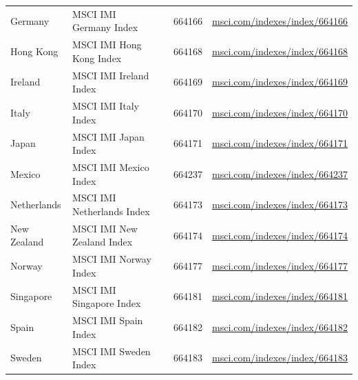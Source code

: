 {\begin{longtable}{l l l l l}
\hspace{1em}Germany & MSCI IMI Germany Index &  & 664166 & \href{https://www.msci.com/indexes/index/664166}{msci.com/indexes/index/664166} \\
\hspace{1em}Hong Kong & MSCI IMI Hong Kong Index &  & 664168 & \href{https://www.msci.com/indexes/index/664168}{msci.com/indexes/index/664168} \\
\hspace{1em}Ireland & MSCI IMI Ireland Index &  & 664169 & \href{https://www.msci.com/indexes/index/664169}{msci.com/indexes/index/664169} \\
\hspace{1em}Italy & MSCI IMI Italy Index &  & 664170 & \href{https://www.msci.com/indexes/index/664170}{msci.com/indexes/index/664170} \\
\hspace{1em}Japan & MSCI IMI Japan Index &  & 664171 & \href{https://www.msci.com/indexes/index/664171}{msci.com/indexes/index/664171} \\
\hspace{1em}Mexico & MSCI IMI Mexico Index &  & 664237 & \href{https://www.msci.com/indexes/index/664237}{msci.com/indexes/index/664237} \\
\hspace{1em}Netherlands & MSCI IMI Netherlands Index &  & 664173 & \href{https://www.msci.com/indexes/index/664173}{msci.com/indexes/index/664173} \\
\hspace{1em}New Zealand & MSCI IMI New Zealand Index &  & 664174 & \href{https://www.msci.com/indexes/index/664174}{msci.com/indexes/index/664174} \\
\hspace{1em}Norway & MSCI IMI Norway Index &  & 664177 & \href{https://www.msci.com/indexes/index/664177}{msci.com/indexes/index/664177} \\
\hspace{1em}Singapore & MSCI IMI Singapore Index &  & 664181 & \href{https://www.msci.com/indexes/index/664181}{msci.com/indexes/index/664181} \\
\hspace{1em}Spain & MSCI IMI Spain Index &  & 664182 & \href{https://www.msci.com/indexes/index/664182}{msci.com/indexes/index/664182} \\
\hspace{1em}Sweden & MSCI IMI Sweden Index &  & 664183 & \href{https://www.msci.com/indexes/index/664183}{msci.com/indexes/index/664183} \\

\end{longtable}}
